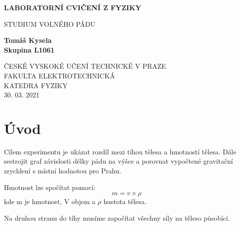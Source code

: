 \documentclass[titlepage]{article}
\begin{document}
    \begin{titlepage}
        \begin{center}
            \vspace*{1cm}
                
            \Large
            \textbf{LABORATORNÍ CVIČENÍ Z FYZIKY}
                
            \vspace{0.5cm}
            STUDIUM VOLNÉHO PÁDU
                
            \vspace{1.5cm}
                
            \textbf{Tomáš Kysela}\\
            \textbf{Skupina L1061}
                
            \vfill
                
            \vspace{0.8cm}
            
            
            ČESKÉ VYSKOKÉ UČENÍ TECHNICKÉ V PRAZE\\
            FAKULTA ELEKTROTECHNICKÁ\\
            KATEDRA FYZIKY\\
            30. 03. 2021
                
        \end{center}
    \end{titlepage}
    	\tableofcontents
    \newpage
    \section{Úvod}
        Cílem experimentu je ukázat rozdíl mezi tíhou tělesa a hmotností tělesa. Dále sestrojit graf závislosti délky pádu na výšce a porovnat vypočtené gravitační zrychlení s místní hodnotou pro Prahu.\newline
        
        Hmotnost lze spočítat pomocí:
        \begin{equation}
            m = v \times \rho
        \end{equation}
        kde m je hmotnost, V objem a $\rho$ hustota tělesa.\newline
        
        Na druhou stranu do tíhy musíme započítat všechny síly na těleso působící.
\end{document}
